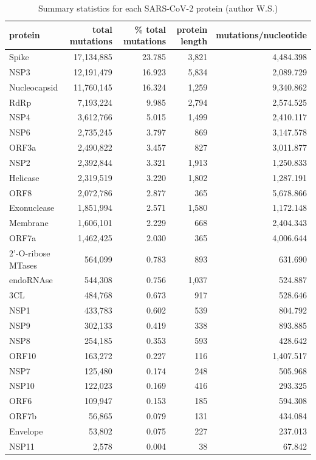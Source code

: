\documentclass{article}
\begin{document}
\begin{table}

\caption{\label{tab:tab1}Summary statistics for each SARS-CoV-2 protein (author W.S.)}
\centering
\begin{tabular}[t]{lrrrr}
\toprule
protein & total mutations & \% total mutations & protein length & mutations/nucleotide\\
\midrule
Spike & 17,134,885 & 23.785 & 3,821 & 4,484.398\\
NSP3 & 12,191,479 & 16.923 & 5,834 & 2,089.729\\
Nucleocapsid & 11,760,145 & 16.324 & 1,259 & 9,340.862\\
RdRp & 7,193,224 & 9.985 & 2,794 & 2,574.525\\
NSP4 & 3,612,766 & 5.015 & 1,499 & 2,410.117\\
\addlinespace
NSP6 & 2,735,245 & 3.797 & 869 & 3,147.578\\
ORF3a & 2,490,822 & 3.457 & 827 & 3,011.877\\
NSP2 & 2,392,844 & 3.321 & 1,913 & 1,250.833\\
Helicase & 2,319,519 & 3.220 & 1,802 & 1,287.191\\
ORF8 & 2,072,786 & 2.877 & 365 & 5,678.866\\
\addlinespace
Exonuclease & 1,851,994 & 2.571 & 1,580 & 1,172.148\\
Membrane & 1,606,101 & 2.229 & 668 & 2,404.343\\
ORF7a & 1,462,425 & 2.030 & 365 & 4,006.644\\
2’-O-ribose MTases & 564,099 & 0.783 & 893 & 631.690\\
endoRNAse & 544,308 & 0.756 & 1,037 & 524.887\\
\addlinespace
3CL & 484,768 & 0.673 & 917 & 528.646\\
NSP1 & 433,783 & 0.602 & 539 & 804.792\\
NSP9 & 302,133 & 0.419 & 338 & 893.885\\
NSP8 & 254,185 & 0.353 & 593 & 428.642\\
ORF10 & 163,272 & 0.227 & 116 & 1,407.517\\
\addlinespace
NSP7 & 125,480 & 0.174 & 248 & 505.968\\
NSP10 & 122,023 & 0.169 & 416 & 293.325\\
ORF6 & 109,947 & 0.153 & 185 & 594.308\\
ORF7b & 56,865 & 0.079 & 131 & 434.084\\
Envelope & 53,802 & 0.075 & 227 & 237.013\\
\addlinespace
NSP11 & 2,578 & 0.004 & 38 & 67.842\\
\bottomrule
\end{tabular}
\end{table}
\end{document}
